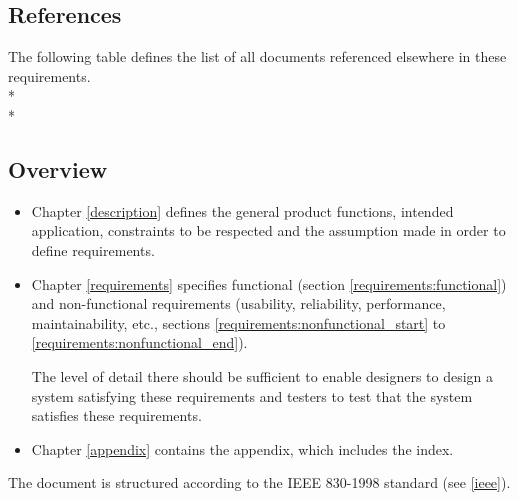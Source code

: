 \subsection{References}
\label{intro:references}
The following table defines the list of all documents referenced elsewhere in these requirements.
\\*
\\*
\begin{reference_table}
\end{reference_table}


\subsection{Overview}
\label{intro:overview}
\begin{itemize}
  \item Chapter \ref{description} defines the general product functions, intended application, constraints to be respected and the assumption made in order to define requirements.
  \item Chapter \ref{requirements} specifies functional (section \ref{requirements:functional}) and non-functional requirements (usability, reliability, performance, maintainability, etc., sections \ref{requirements:nonfunctional_start} to \ref{requirements:nonfunctional_end}).

The level of detail there should be sufficient to enable designers to design a system satisfying these requirements and testers to test that the system satisfies these requirements.
  \item Chapter \ref{appendix} contains the appendix, which includes the index.
\end{itemize}
The document is structured according to the IEEE 830-1998 standard (see \ref{ieee}).
